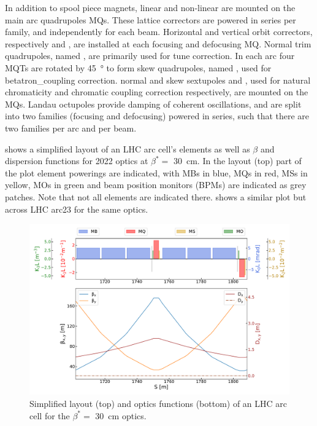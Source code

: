 In addition to spool piece magnets, linear and non-linear  are mounted on the main arc quadrupoles MQs.
These lattice correctors are powered in series per family, and independently for each beam.
Horizontal and vertical orbit correctors, respectively  and , are installed at each focusing and defocusing MQ.
Normal \gls{trim} quadrupoles, named , are primarily used for tune correction.
In each arc four MQTs are rotated by \qty{45}{\degree} to form \gls{skew} quadrupoles, named , used for \gls{betatron_coupling} correction.
\Gls{normal} and \gls{skew} sextupoles  and , used for natural chromaticity and chromatic coupling correction respectively, are mounted on the MQs.
Landau octupoles  provide damping of coherent oscillations, and are split into two families (focusing and defocusing) powered in series, such that there are two families per arc and per beam.
\break

 shows a simplified layout of an LHC arc cell's elements as well as \(\beta\) and dispersion functions for \num{2022} optics at \(\beta^{\ast} =\) \qty{30}{\centi\meter}.
In the layout (top) part of the plot element powerings are indicated, with MBs in \textcolor{mplblue}{blue}, MQs in \textcolor{latwiss_red}{red}, MSs in \textcolor{latwiss_yellow}{yellow}, MOs in \textcolor{latwiss_green}{green} and beam position monitors (BPMs) are indicated as grey patches.
Note that not all elements are indicated there.
 shows a similar plot but across LHC arc\num{23} for the same optics.

\begin{figure}[!hbt]
  \centering
  \includegraphics*[width=\linewidth]{Figures/Optics_Measurements_Corrections_at_LHC/lhc_arc_cell.pdf}
  \caption{Simplified layout (top) and optics functions (bottom) of an LHC arc cell for the \(\beta^{\ast} =\) \qty{30}{\centi\meter} optics.}
  \label{figure:lhc_arc_cell_latwiss}
\end{figure}

